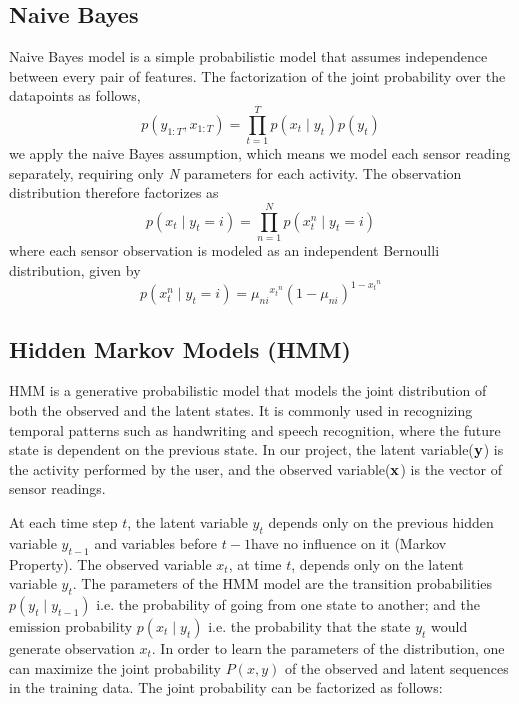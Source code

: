 \documentclass[11pt, oneside]{article}   	%
\begin{document}
\subsection{Naive Bayes}
Naive Bayes model is a simple probabilistic model that assumes independence between every pair of features. The factorization of the joint probability over the datapoints as follows,
\begin{equation}
p({y}_{1:T},{x}_{1:T})=\prod_{t=1}^{T}p({{x}_{t}\mid {y}_{t}}^{})p({y}_{t})
\end{equation}
we apply the naive Bayes assumption, which means we model each sensor reading separately, requiring only
\textit{N} parameters for each activity. The observation distribution therefore factorizes as
\begin{equation}
p({x}_{t}\mid{y}_{t}=i)=\prod_{n=1}^{N}p({{x}_{t}^{n}\mid {y}_{t}}=i)
\end{equation}
where each sensor observation is modeled as an independent Bernoulli distribution, given by
\begin{equation}
p({{x}_{t}^{n}\mid {y}_{t}}=i)={{\mu}_{ni}}^{{{x}_{t}}^n}{(1-{\mu}_{ni})}^{1-{{x}_{t}}^n}
\end{equation}

\subsection{Hidden Markov Models (HMM)}
HMM is a generative probabilistic model that models the joint distribution of both the observed and the latent states. It is commonly used in recognizing temporal patterns such as handwriting and speech recognition, where the future state is dependent on the previous state.  In our project, the latent variable($\bf{y}$) is the activity performed by the user, and the observed variable($\bf{x}$) is the vector of sensor readings. 

At each time step $t$, the latent variable $y_t$ depends only on the previous hidden variable $y_{t-1}$ and variables before $t-1$have no influence on it (Markov Property). The observed variable $x_t$, at time $t$, depends only on the latent variable $y_t$. The parameters of the HMM model are the transition probabilities $p(y_{t}\mid y_{t-1})$ i.e.  the probability of going from one state to another; and the emission probability $p(x_{t}\mid y_{t})$ i.e. the probability that the state $y_t$ would generate observation $x_{t}$. In order to learn the parameters of the distribution, one can maximize the joint probability $P(x,y)$ of the observed and latent sequences in the training data. The joint probability can be factorized as follows:
\end{document}
